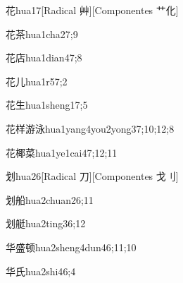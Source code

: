 \begin{verbete}{花}{hua1}{7}[Radical 艸][Componentes 艹化]
\end{verbete}

\begin{verbete}{花茶}{hua1cha2}{7;9}
\end{verbete}

\begin{verbete}{花店}{hua1dian4}{7;8}
\end{verbete}

\begin{verbete}{花儿}{hua1r5}{7;2}
\end{verbete}

\begin{verbete}{花生}{hua1sheng1}{7;5}
\end{verbete}

\begin{verbete}{花样游泳}{hua1yang4you2yong3}{7;10;12;8}
\end{verbete}

\begin{verbete}{花椰菜}{hua1ye1cai4}{7;12;11}
\end{verbete}

\begin{verbete}{划}{hua2}{6}[Radical 刀][Componentes 戈刂]
\end{verbete}

\begin{verbete}{划船}{hua2chuan2}{6;11}
\end{verbete}

\begin{verbete}{划艇}{hua2ting3}{6;12}
\end{verbete}

\begin{verbete}{华盛顿}{hua2sheng4dun4}{6;11;10}
\end{verbete}

\begin{verbete}{华氏}{hua2shi4}{6;4}
\end{verbete}


